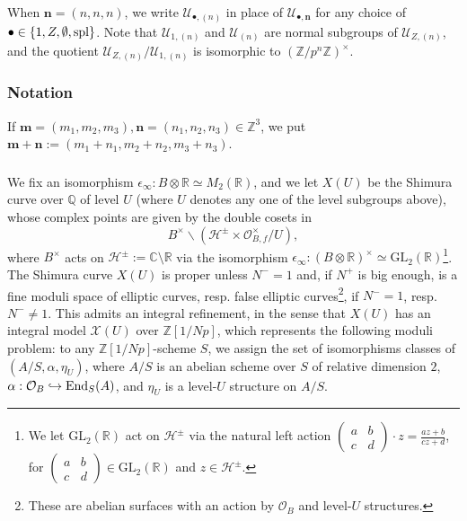 \documentclass{amsart}
\numberwithin{equation}{section}
\newcommand{\QQ}{\mathbb{Q}}
\newcommand{\ZZ}{\mathbb{Z}}
\newcommand{\cO}{\mathcal{O}}
\newcommand{\GL}{\mathrm{GL}}
\begin{document}
When $\mathbf{n}=(n,n,n)$, we write $\mathcal{U}_{\bullet,(n)}$ in place of $ \mathcal{U}_{\bullet,\mathbf{n}}$ for any choice of $\bullet \in \{ 1, Z , \emptyset, {\rm spl} \}$. Note that $\mathcal{U}_{1,(n)}$ and $\mathcal{U}_{(n)}$ are normal subgroups of $\mathcal{U}_{Z,(n)}$, and the quotient $\mathcal{U}_{Z,(n)}/\mathcal{U}_{1,(n)}$ is isomorphic to $(\ZZ / p^n \ZZ )^\times$.   

\subsubsection{Notation} If $\mathbf{m}=(m_1,m_2,m_3), \mathbf{n}=(n_1,n_2,n_3)\in \ZZ^3$, we put $\mathbf{m}+\mathbf{n}:=(m_1+n_1,m_2+n_2,m_3+n_3)$.

\subsubsection{} We fix an isomorphism $\epsilon_\infty : B \otimes \mathbb{R} \simeq M_2(\mathbb{R})$, and we let $X(U)$ be the Shimura curve over $\QQ$ of level $U$ (where $U$ denotes any one of the level subgroups above), whose complex points are given by the double cosets in \[ B^{\times} \backslash (\mathcal{H}^{\pm} \times \cO_{B,f}^\times / U), \] 
where $B^{\times}$ acts on $\mathcal{H}^{\pm}:=\mathbb{C}\setminus \mathbb{R}$ via the isomorphism $\epsilon_\infty: (B \otimes \mathbb{R})^\times \simeq \GL_2(\mathbb{R})$\footnote{We let $\GL_2(\mathbb{R})$ act on $\mathcal{H}^{\pm}$ via the natural left action $\left ( \begin{smallmatrix}
    a & b \\ c & d 
\end{smallmatrix} \right ) \cdot z = \frac{a z +b }{c z + d}$, for $\left ( \begin{smallmatrix}
    a & b \\ c & d 
\end{smallmatrix} \right ) \in \GL_2(\mathbb{R})$ and $z \in \mathcal{H}^{\pm}$.}. The Shimura curve $X(U)$ is proper unless $N^-=1$ and, if $N^+ $ is big enough, is a fine moduli space of elliptic curves, resp. false elliptic curves\footnote{These are abelian surfaces with an action by $\mathcal{O}_{B}$ and level-$U$ structures.}, if $N^-=1$, resp. $N^-\not =1$. This admits an integral refinement, in the sense that $X(U)$ has an integral model $\mathscr{X}(U)$ over $\ZZ[1/N p]$, which represents the following moduli problem: to any $\ZZ[1/Np]$-scheme $S$, we assign the set of isomorphisms classes of $(A/S, \alpha, \eta_{U})$, where $A/S$ is an abelian scheme over $S$ of relative dimension $2$, $\alpha: \mathcal{O}_{B} \hookrightarrow {\rm End}_S(A)$, and $\eta_{U}$ is a level-$U$ structure on $A/S$.
\end{document}
